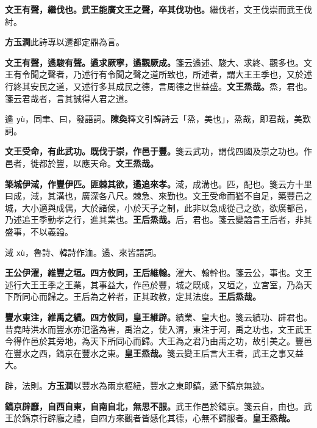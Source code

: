 \textbf{文王有聲，繼伐也。武王能廣文王之聲，卒其伐功也。}{\footnotesize 繼伐者，文王伐崇而武王伐紂。}

\begin{quoting}\textbf{方玉潤}此詩專以遷都定鼎為言。\end{quoting}

\textbf{文王有聲，遹駿有聲。遹求厥寧，遹觀厥成。}{\footnotesize 箋云遹述、駿大、求終、觀多也。文王有令聞之聲者，乃述行有令聞之聲之道所致也，所述者，謂大王王季也，又於述行終其安民之道，又述行多其成民之德，言周德之世益盛。}\textbf{文王烝哉。}{\footnotesize 烝，君也。箋云君哉者，言其誠得人君之道。}

\begin{quoting}遹 \texttt{yù}，同聿、曰，發語詞。\textbf{陳奐}釋文引韓詩云「烝，美也」，烝哉，即君哉，美歎詞。\end{quoting}

\textbf{文王受命，有此武功。既伐于崇，作邑于豐。}{\footnotesize 箋云武功，謂伐四國及崇之功也。作邑者，徙都於豐，以應天命。}\textbf{文王烝哉。}

\textbf{築城伊淢，作豐伊匹。匪棘其欲，遹追來孝。}{\footnotesize 淢，成溝也。匹，配也。箋云方十里曰成，淢，其溝也，廣深各八尺。棘急、來勤也。文王受命而猶不自足，築豐邑之城，大小適與成偶，大於諸侯，小於天子之制，此非以急成從己之欲，欲廣都邑，乃述追王季勤孝之行，進其業也。}\textbf{王后烝哉。}{\footnotesize 后，君也。箋云變謚言王后者，非其盛事，不以義謚。}

\begin{quoting}淢 \texttt{xù}，魯詩、韓詩作洫。遹、來皆語詞。\end{quoting}

\textbf{王公伊濯，維豐之垣。四方攸同，王后維翰。}{\footnotesize 濯大、翰幹也。箋云公，事也。文王述行大王王季之王業，其事益大，作邑於豐，城之既成，又垣之，立宮室，乃為天下所同心而歸之。王后為之幹者，正其政教，定其法度。}\textbf{王后烝哉。}

\textbf{豐水東注，維禹之績。四方攸同，皇王維辟。}{\footnotesize 績業、皇大也。箋云績功、辟君也。昔堯時洪水而豐水亦氾濫為害，禹治之，使入渭，東注于河，禹之功也，文王武王今得作邑於其旁地，為天下所同心而歸。大王為之君乃由禹之功，故引美之。豐邑在豐水之西，鎬京在豐水之東。}\textbf{皇王烝哉。}{\footnotesize 箋云變王后言大王者，武王之事又益大。}

\begin{quoting}辟，法則。\textbf{方玉潤}以豐水為兩京樞紐，豐水之東即鎬，遞下鎬京無迹。\end{quoting}

\textbf{鎬京辟廱，自西自東，自南自北，無思不服。}{\footnotesize 武王作邑於鎬京。箋云自，由也。武王於鎬京行辟廱之禮，自四方來觀者皆感化其德，心無不歸服者。}\textbf{皇王烝哉。}


